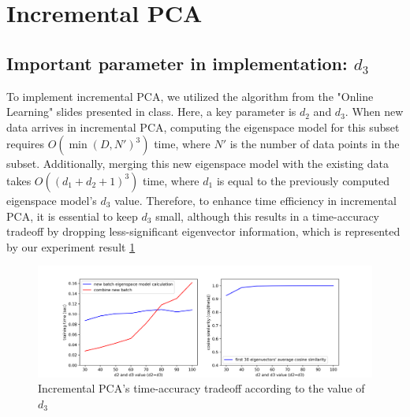 \section{Incremental PCA}
\label{sec:intro}

\subsection{Important parameter in implementation: $d_3$}
To implement incremental PCA, we utilized the algorithm from the "Online Learning" slides presented in class. Here, a key parameter is $d_2$ and $d_3$. When new data arrives in incremental PCA, computing the eigenspace model for this subset requires $O(\min(D, N')^3)$ time, where $N'$ is the number of data points in the subset. Additionally, merging this new eigenspace model with the existing data takes $O((d_1 + d_2 + 1)^3)$ time, where $d_1$ is equal to the previously computed eigenspace model's $d_3$ value. Therefore, to enhance time efficiency in incremental PCA, it is essential to keep $d_3$ small, although this results in a time-accuracy tradeoff by dropping less-significant eigenvector information, which is represented by our experiment result \cref{fig:q2-fig5}
\vspace{-0.5cm}

\begin{figure}[htbp]
	\centering
	\includegraphics[width=\linewidth]{image/q2-fig5.png}
	
	\caption{Incremental PCA's time-accuracy tradeoff according to the value of $d_3$}
	\label{fig:q2-fig5}
\end{figure}
\vspace{-0.5cm}

